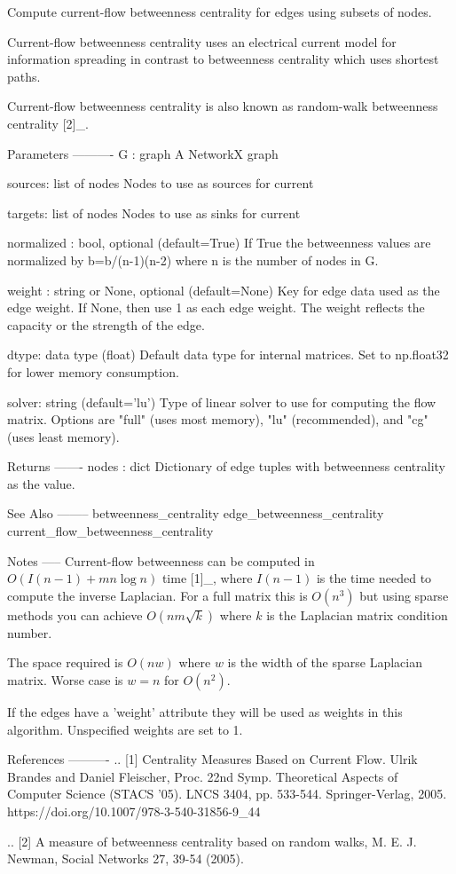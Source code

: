 \begin{DoxyVerb}Compute current-flow betweenness centrality for edges using subsets
of nodes.

Current-flow betweenness centrality uses an electrical current
model for information spreading in contrast to betweenness
centrality which uses shortest paths.

Current-flow betweenness centrality is also known as
random-walk betweenness centrality [2]_.

Parameters
----------
G : graph
  A NetworkX graph

sources: list of nodes
  Nodes to use as sources for current

targets: list of nodes
  Nodes to use as sinks for current

normalized : bool, optional (default=True)
  If True the betweenness values are normalized by b=b/(n-1)(n-2) where
  n is the number of nodes in G.

weight : string or None, optional (default=None)
  Key for edge data used as the edge weight.
  If None, then use 1 as each edge weight.
  The weight reflects the capacity or the strength of the
  edge.

dtype: data type (float)
  Default data type for internal matrices.
  Set to np.float32 for lower memory consumption.

solver: string (default='lu')
   Type of linear solver to use for computing the flow matrix.
   Options are "full" (uses most memory), "lu" (recommended), and
   "cg" (uses least memory).

Returns
-------
nodes : dict
   Dictionary of edge tuples with betweenness centrality as the value.

See Also
--------
betweenness_centrality
edge_betweenness_centrality
current_flow_betweenness_centrality

Notes
-----
Current-flow betweenness can be computed in $O(I(n-1)+mn \log n)$
time [1]_, where $I(n-1)$ is the time needed to compute the
inverse Laplacian.  For a full matrix this is $O(n^3)$ but using
sparse methods you can achieve $O(nm{\sqrt k})$ where $k$ is the
Laplacian matrix condition number.

The space required is $O(nw)$ where $w$ is the width of the sparse
Laplacian matrix.  Worse case is $w=n$ for $O(n^2)$.

If the edges have a 'weight' attribute they will be used as
weights in this algorithm.  Unspecified weights are set to 1.

References
----------
.. [1] Centrality Measures Based on Current Flow.
   Ulrik Brandes and Daniel Fleischer,
   Proc. 22nd Symp. Theoretical Aspects of Computer Science (STACS '05).
   LNCS 3404, pp. 533-544. Springer-Verlag, 2005.
   https://doi.org/10.1007/978-3-540-31856-9_44

.. [2] A measure of betweenness centrality based on random walks,
   M. E. J. Newman, Social Networks 27, 39-54 (2005).
\end{DoxyVerb}
 
